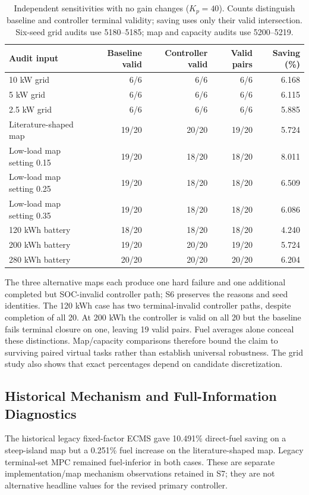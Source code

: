 \documentclass[energies,article,submit,moreauthors]{Definitions/mdpi}
\begin{document}
\begin{table}[H]
\caption{Independent sensitivities with no gain changes ($K_p=40$). Counts distinguish baseline and controller terminal validity; saving uses only their valid intersection. Six-seed grid audits use 5180--5185; map and capacity audits use 5200--5219.}\label{tab:sensitivity}
\small\begin{tabularx}{\linewidth}{@{}Xrrrr@{}}\toprule
Audit input & Baseline valid & Controller valid & Valid pairs & Saving (\%) \\\midrule
10 kW grid & 6/6 & 6/6 & 6/6 & 6.168 \\
5 kW grid & 6/6 & 6/6 & 6/6 & 6.115 \\
2.5 kW grid & 6/6 & 6/6 & 6/6 & 5.885 \\
Literature-shaped map & 19/20 & 20/20 & 19/20 & 5.724 \\
Low-load map setting 0.15 & 19/20 & 18/20 & 18/20 & 8.011 \\
Low-load map setting 0.25 & 19/20 & 18/20 & 18/20 & 6.509 \\
Low-load map setting 0.35 & 19/20 & 18/20 & 18/20 & 6.086 \\
120 kWh battery & 18/20 & 18/20 & 18/20 & 4.240 \\
200 kWh battery & 19/20 & 20/20 & 19/20 & 5.724 \\
280 kWh battery & 20/20 & 20/20 & 20/20 & 6.204 \\\bottomrule
\end{tabularx}
\end{table}

The three alternative maps each produce one hard failure and one additional completed but SOC-invalid controller path; S6 preserves the reasons and seed identities. The 120 kWh case has two terminal-invalid controller paths, despite completion of all 20. At 200 kWh the controller is valid on all 20 but the baseline fails terminal closure on one, leaving 19 valid pairs. Fuel averages alone conceal these distinctions. Map/capacity comparisons therefore bound the claim to surviving paired virtual tasks rather than establish universal robustness. The grid study also shows that exact percentages depend on candidate discretization.

\subsection{Historical Mechanism and Full-Information Diagnostics}
The historical legacy fixed-factor ECMS gave 10.491\% direct-fuel saving on a steep-island map but a 0.251\% fuel increase on the literature-shaped map. Legacy terminal-set MPC remained fuel-inferior in both cases. These are separate implementation/map mechanism observations retained in S7; they are not alternative headline values for the revised primary controller.
\end{document}
